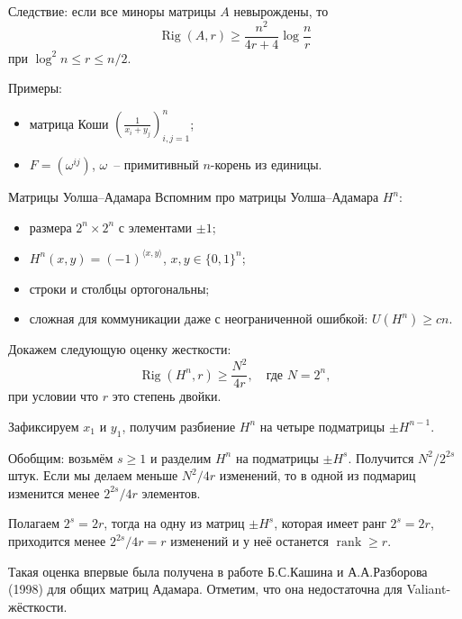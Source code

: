 \documentclass[handout]{beamer}
\renewcommand\le{\leqslant}
\renewcommand\ge{\geqslant}
\DeclareMathOperator{\rank}{rank}
\DeclareMathOperator{\Rig}{Rig}
\begin{document}
\begin{frame}
    Следствие: если все миноры матрицы $A$ невырождены, то
    $$
    \Rig(A,r)\ge \frac{n^2}{4r+4}\log\frac{n}{r}
    $$
    при $\log^2 n\le r\le n/2$.


    Примеры:
    \begin{itemize}
        \item матрица Коши $(\frac{1}{x_i+y_j})_{i,j=1}^n$;
        \item $F=(\omega^{ij})$, $\omega$~-- примитивный $n$-корень из единицы.
    \end{itemize}
\end{frame}


\begin{frame}{Матрицы Уолша--Адамара}
    Вспомним про матрицы Уолша--Адамара $H^n$:
    \pause
    \begin{itemize}
        \item размера $2^n\times 2^n$ с элементами $\pm 1$;
        \item $H^n(x,y)=(-1)^{\langle x,y\rangle}$, $x,y\in\{0,1\}^n$;
        \item строки и столбцы ортогональны;
        \item сложная для коммуникации даже с неограниченной ошибкой: $U(H^n)\ge
            cn$.
    \end{itemize}
\end{frame}

\begin{frame}

    Докажем следующую оценку жесткости:
    $$
    \Rig(H^n,r)\ge \frac{N^2}{4r},\quad\mbox{где $N=2^n$},
    $$
    при условии что $r$ это степень двойки.
    \pause

    Зафиксируем $x_1$ и $y_1$, получим разбиение $H^n$ на
    четыре подматрицы $\pm H^{n-1}$.
    \pause
    
    Обобщим: возьмём $s\ge 1$ и разделим $H^n$ на подматрицы $\pm H^s$.
    Получится $N^2/2^{2s}$ штук. Если мы делаем меньше $N^2/4r$ изменений, то в
    одной из подмариц изменится менее $2^{2s}/4r$ элементов.
    \pause

    Полагаем $2^s=2r$, тогда на одну из матриц $\pm H^s$, которая имеет ранг
    $2^s=2r$, приходится менее $2^{2s}/4r=r$ изменений и у неё останется
    $\rank\ge r$.
    \pause\vspace{5pt}

    Такая оценка впервые была получена в работе Б.С.Кашина и А.А.Разборова
    (1998) для общих матриц Адамара. Отметим, что она недостаточна для
    Valiant-жёсткости.

\end{frame}
\end{document}
